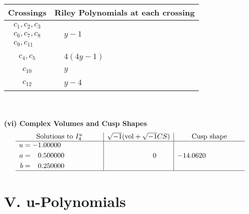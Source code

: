 \documentclass[1p]{elsarticle_modified}
\theoremstyle{definition}
\newcommand{\I}{\sqrt{-1}}
\begin{document}
\begin{tabular}{m{50pt}|m{274pt}}
Crossings & \hspace{64pt}Riley Polynomials at each crossing \\
\hline $$\begin{aligned}c_{1},c_{2},c_{3}\\c_{6},c_{7},c_{8}\\c_{9},c_{11}\end{aligned}$$&$\begin{aligned}
&y-1
\end{aligned}$\\
\hline $$\begin{aligned}c_{4},c_{5}\end{aligned}$$&$\begin{aligned}
&4(4 y-1)
\end{aligned}$\\
\hline $$\begin{aligned}c_{10}\end{aligned}$$&$\begin{aligned}
&y
\end{aligned}$\\
\hline $$\begin{aligned}c_{12}\end{aligned}$$&$\begin{aligned}
&y-4
\end{aligned}$\\
\hline
\end{tabular}\\~\\
\newpage\flushleft \textbf{(vi) Complex Volumes and Cusp Shapes}
$$\begin{array}{c|c|c}  
\text{Solutions to }I^u_{4}& \I (\text{vol} + \sqrt{-1}CS) & \text{Cusp shape}\\
 \hline 
\begin{aligned}
u &= -1.00000\phantom{ +0.000000I} \\
a &= \phantom{-}0.500000\phantom{ +0.000000I} \\
b &= \phantom{-}0.250000\phantom{ +0.000000I}\end{aligned}
 & \phantom{-0.000000 } 0 & -14.0620\phantom{ +0.000000I}\\
 \hline 
 \end{array}$$\newpage
\newpage\renewcommand{\arraystretch}{1}
\centering \section*{ V. u-Polynomials}
\end{document}
